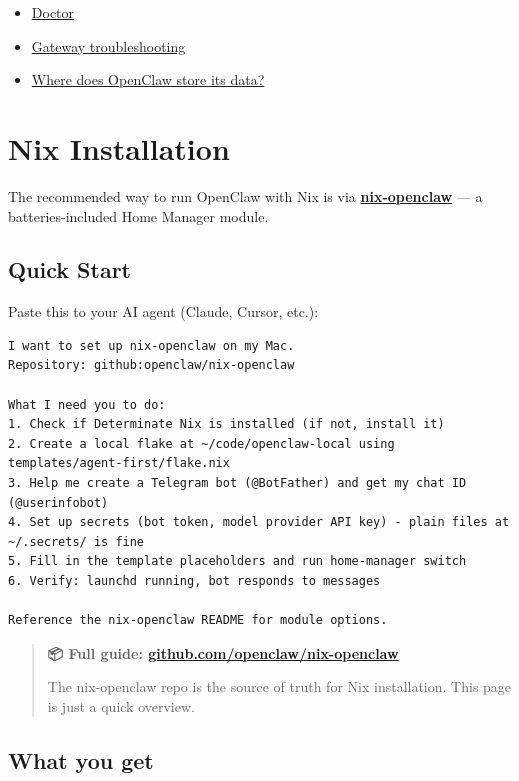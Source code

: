 \begin{itemize}
  \item \href{/gateway/doctor}{Doctor}
  \item \href{/gateway/troubleshooting}{Gateway troubleshooting}
  \item \href{/help/faq\#where-does-openclaw-store-its-data}{Where does OpenClaw store its data?}
\end{itemize}



\clearpage

\section{Nix Installation}


The recommended way to run OpenClaw with Nix is via \textbf{\href{https://github.com/openclaw/nix-openclaw}{nix-openclaw}} — a batteries-included Home Manager module.

\subsection{Quick Start}


Paste this to your AI agent (Claude, Cursor, etc.):

\begin{lstlisting}
I want to set up nix-openclaw on my Mac.
Repository: github:openclaw/nix-openclaw

What I need you to do:
1. Check if Determinate Nix is installed (if not, install it)
2. Create a local flake at ~/code/openclaw-local using templates/agent-first/flake.nix
3. Help me create a Telegram bot (@BotFather) and get my chat ID (@userinfobot)
4. Set up secrets (bot token, model provider API key) - plain files at ~/.secrets/ is fine
5. Fill in the template placeholders and run home-manager switch
6. Verify: launchd running, bot responds to messages

Reference the nix-openclaw README for module options.
\end{lstlisting}


\begin{quote}
\textbf{📦 Full guide: \href{https://github.com/openclaw/nix-openclaw}{github.com/openclaw/nix-openclaw}}

The nix-openclaw repo is the source of truth for Nix installation. This page is just a quick overview.
\end{quote}


\subsection{What you get}


